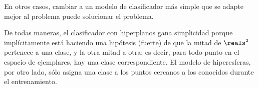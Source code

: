 En otros casos, cambiar a un modelo de clasificador más simple que se adapte mejor al problema puede solucionar el problema.


De todas maneras, el clasificador con hiperplanos gana simplicidad porque implícitamente está haciendo una hipótesis (fuerte) de que la mitad de $\reals^2$ pertenece a una clase, y la otra mitad a otra; es decir, para todo punto en el espacio de ejemplares, hay una clase correspondiente. El modelo de hiperesferas, por otro lado, sólo asigna una clase a los puntos cercanos a los conocidos durante el entrenamiento.
